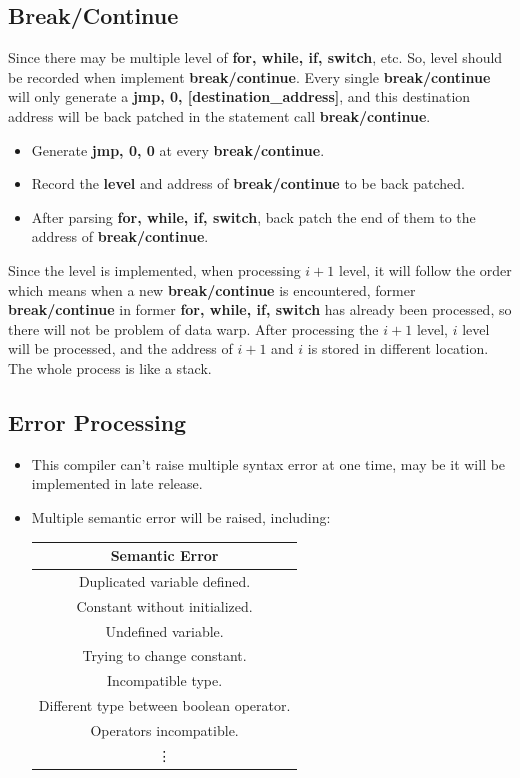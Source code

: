 \documentclass{article}
\begin{document}
		\subsection{Break/Continue}
		\hypertarget{4.17}{}
		Since there may be multiple level of \textbf{for, while, if, switch}, etc. So, level should be recorded when implement \textbf{break/continue}. Every single \textbf{break/continue} will only generate a \textbf{jmp, 0, [destination\_address]}, and this destination address will be back patched in the statement call \textbf{break/continue}.
		\begin{itemize}
		\item Generate \textbf{jmp, 0, 0} at every \textbf{break/continue}.
		\item Record the \textbf{level} and address of \textbf{break/continue} to be back patched. 
		\item After parsing \textbf{for, while, if, switch}, back patch the end of them to the address of \textbf{break/continue}.
		\end{itemize}
		Since the level is implemented, when processing $ i+1 $ level, it will follow the order which means when a new \textbf{break/continue} is encountered, former \textbf{break/continue} in former \textbf{for, while, if, switch} has already been processed, so there will not be problem of data warp. After processing the $ i+1 $ level, $ i $ level will be processed, and the address of $ i+1 $ and $ i $ is stored in different location. The whole process is like a stack.
		\subsection{Error Processing}
		\begin{itemize}
		\item This compiler can't raise multiple syntax error at one time, may be it will be implemented in late release.
		\item Multiple semantic error will be raised, including:\\
		\begin{center}
			\begin{tabular}{c}
			\toprule
			Semantic Error \\
			\midrule
			Duplicated variable defined.\\
			Constant without initialized.\\
			Undefined variable.\\
			Trying to change constant.\\
			Incompatible type.\\
			Different type between boolean operator.\\
			Operators incompatible.\\
			\vdots \\
			\bottomrule
			\end{tabular}
		\end{center}
		
		\end{itemize}
\end{document}
